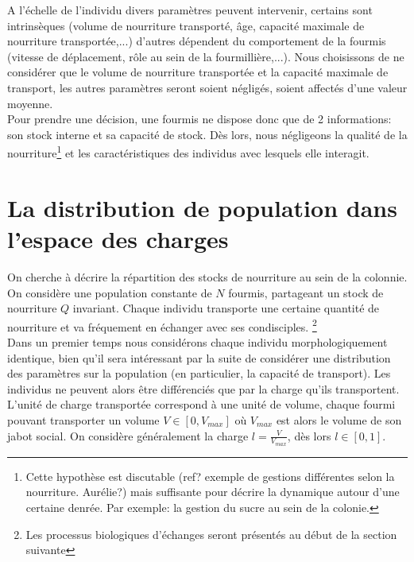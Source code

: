 A l'échelle de l'individu divers paramètres peuvent intervenir, certains sont intrinsèques (volume de nourriture transporté, âge, capacité maximale de nourriture transportée,...) d'autres dépendent du comportement de la fourmis (vitesse de déplacement, rôle au sein de la fourmillière,...). Nous choisissons de ne considérer que le volume de nourriture transportée et la capacité maximale de transport, les autres paramètres seront soient négligés, soient affectés d'une valeur moyenne.\\

Pour prendre une décision, une fourmis ne dispose donc que de 2 informations: son stock interne et sa capacité de stock. Dès lors, nous négligeons la qualité de la nourriture\footnote{Cette hypothèse est discutable (ref? exemple de gestions différentes selon la nourriture. Aurélie?) mais suffisante pour décrire la dynamique autour d'une certaine denrée. Par exemple: la gestion du sucre au sein de la colonie.} et les caractéristiques des individus avec lesquels elle interagit. \\




\section{La distribution de population dans l'espace des charges}
On cherche à décrire la répartition des stocks de nourriture au sein de la colonnie.\\

On considère une population constante de $N$ fourmis, partageant un stock de nourriture $Q$ invariant. Chaque individu transporte une certaine quantité de nourriture  et va fréquement en échanger avec ses condisciples. \footnote{Les processus biologiques d'échanges seront présentés au début de la section suivante} \\

Dans un premier temps nous considérons chaque individu morphologiquement identique, bien qu'il sera intéressant par la suite de considérer une distribution des paramètres sur la population (en particulier, la capacité de transport). Les individus ne peuvent alors être différenciés que par la charge qu'ils transportent.\\

L'unité de charge transportée correspond à une unité de volume, chaque fourmi pouvant transporter un volume $V\in[0,V_{max}]$ où $V_{max}$ est alors le volume de son jabot social. On considère généralement la charge $l=\frac{V}{V_{max}}$, dès lors $l\in[0,1]$.\\

